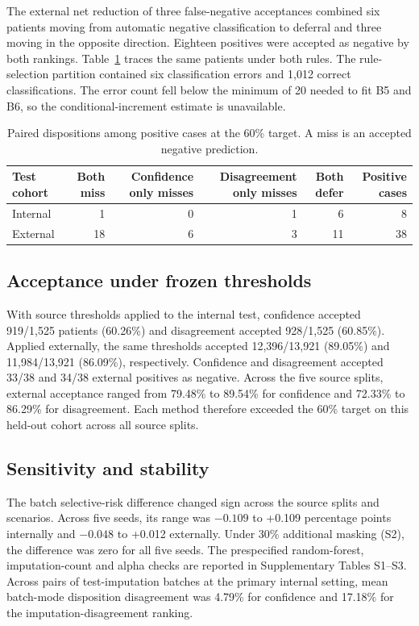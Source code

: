 The external net reduction of three false-negative acceptances combined six patients moving from automatic negative classification to deferral and three moving in the opposite direction. Eighteen positives were accepted as negative by both rankings. Table~\ref{tab:paired} traces the same patients under both rules. The rule-selection partition contained six classification errors and 1{,}012 correct classifications. The error count fell below the minimum of 20 needed to fit B5 and B6, so the conditional-increment estimate is unavailable.

\begin{table}[t]
\centering
\small
\caption{Paired dispositions among positive cases at the 60\% target. A miss is an accepted negative prediction.}
\label{tab:paired}
\begin{tabular}{@{}lrrrrr@{}}
\toprule
Test cohort & Both miss & Confidence only misses & Disagreement only misses & Both defer & Positive cases \\
\midrule
Internal & 1 & 0 & 1 & 6 & 8 \\
External & 18 & 6 & 3 & 11 & 38 \\
\bottomrule
\end{tabular}
\end{table}

\subsection{Acceptance under frozen thresholds}

With source thresholds applied to the internal test, confidence accepted 919/1{,}525 patients (60.26\%) and disagreement accepted 928/1{,}525 (60.85\%). Applied externally, the same thresholds accepted 12{,}396/13{,}921 (89.05\%) and 11{,}984/13{,}921 (86.09\%), respectively. Confidence and disagreement accepted 33/38 and 34/38 external positives as negative. Across the five source splits, external acceptance ranged from 79.48\% to 89.54\% for confidence and 72.33\% to 86.29\% for disagreement. Each method therefore exceeded the 60\% target on this held-out cohort across all source splits.

\subsection{Sensitivity and stability}

The batch selective-risk difference changed sign across the source splits and scenarios. Across five seeds, its range was $-0.109$ to +0.109 percentage points internally and $-0.048$ to +0.012 externally. Under 30\% additional masking (S2), the difference was zero for all five seeds. The prespecified random-forest, imputation-count and alpha checks are reported in Supplementary Tables S1--S3. Across pairs of test-imputation batches at the primary internal setting, mean batch-mode disposition disagreement was 4.79\% for confidence and 17.18\% for the imputation-disagreement ranking.


